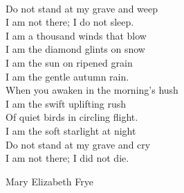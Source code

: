 \newpage
~
\vfill
\begin{english}
   \hspace*{0.5em} Do not stand at my grave and weep
\\ \hspace*{2em} I am not there; I do not sleep.
\\ \hspace*{2em} I am a thousand winds that blow
\\ \hspace*{2em} I am the diamond glints on snow
\\ \hspace*{2em} I am the sun on ripened grain
\\ \hspace*{2em} I am the gentle autumn rain.
\\ \hspace*{2em} When you awaken in the morning’s hush
\\ \hspace*{2em} I am the swift uplifting rush
\\ \hspace*{2em} Of quiet birds in circling flight.
\\ \hspace*{2em} I am the soft starlight at night
\\ \hspace*{2em} Do not stand at my grave and cry
\\ \hspace*{2em} I am not there; I did not die. 
\\ \begin{flushright}Mary Elizabeth Frye\end{flushright}
\end{english}
\vfill
~
\newpage
